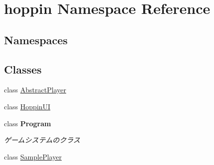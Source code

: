 \hypertarget{namespacehoppin}{}\section{hoppin Namespace Reference}
\label{namespacehoppin}
\subsection*{Namespaces}
\begin{DoxyCompactItemize}
\end{DoxyCompactItemize}
\subsection*{Classes}
\begin{DoxyCompactItemize}
\item 
class \hyperlink{classhoppin_1_1_abstract_player}{Abstract\+Player}
\item 
class \hyperlink{classhoppin_1_1_hoppin_u_i}{Hoppin\+UI}
\item 
class {\bfseries Program}
\begin{DoxyCompactList}\small\item\em ゲームシステムのクラス \end{DoxyCompactList}\item 
class \hyperlink{classhoppin_1_1_sample_player}{Sample\+Player}
\end{DoxyCompactItemize}
